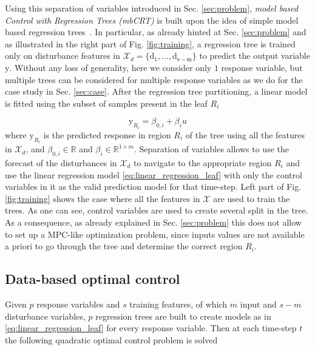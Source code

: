 \textcolor[rgb]{0.00,0.00,1.00}{Using this separation of variables introduced in Sec. \ref{sec:problem}, \emph{model based Control with Regression Trees (mbCRT)} is built upon the idea of simple model based regression trees~\cite{friedman1991multivariate}. In particular, as already hinted at Sec. \ref{sec:problem} and as illustrated in the right part of Fig. \ref{fig:training}, a regression tree is trained only on disturbance features in $\mathcal{X}_d= \{ \mathrm{d_1,\ldots,d_{s-m}} \} $ to predict the output variable $\mathrm{y}$. Without any loss of generality, here we consider only $1$ response variable, but multiple trees can be considered for multiple response variables as we do for the case study in Sec. \ref{sec:case}. After the regression tree partitioning, a linear model is fitted using the subset of samples present in the leaf $R_i$}

\textcolor[rgb]{0.00,0.00,1.00}{\begin{equation}\label{eq:linear_regression_leaf}
\mathrm{y}_{R_i} = \beta_{0,i} + \beta_i u
\end{equation}
where $\mathrm{y}_{R_i}$ is the predicted response in region $R_i$ of the tree using all the features in $\mathcal{X}_d$, and $\beta_{0,i}\in\mathbb{R}$ and $\beta_i\in\mathbb{R}^{1\times m}$. Separation of variables allows to use the forecast of the disturbances in $\mathcal{X}_d$ to navigate to the appropriate region $R_i$ and use the linear regression model \eqref{eq:linear_regression_leaf} with only the control variables in it as the valid prediction model for that time-step. Left part of Fig. \ref{fig:training} shows the case where all the features in $\mathcal{X}$ are used to train the trees. As one can see, control variables are used to create several split in the tree. As a consequence, as already explained in Sec. \ref{sec:problem} this does not allow to set up a MPC-like optimization problem, since inputs values are not available a priori to go through the tree and determine the correct region $R_i$.}

\subsection{Data-based optimal control}
\textcolor[rgb]{0.00,0.00,1.00}{Given $p$ response variables and $s$ training features, of which $m$ input and $s-m$ disturbance variables, $p$ regression trees are built to create models as in \eqref{eq:linear_regression_leaf} for every response variable. Then at each time-step $t$ the following quadratic optimal control problem is solved}

